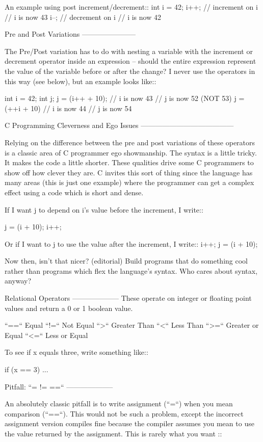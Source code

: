 An example using post increment/decrement::
    int i = 42;
    i++;     // increment on i
    // i is now 43
    i--;     // decrement on i
    // i is now 42

Pre and Post Variations
-----------------------

The Pre/Post variation has to do with nesting a variable with the increment or decrement operator inside an expression -- should the entire expression represent the value of the variable before or after the change? I never use the operators in this way (see below), but an example looks like::

    int i = 42;
    int j;
    j = (i++ + 10);
    // i is now 43
    // j is now 52 (NOT 53)
    j = (++i + 10)
    // i is now 44
    // j is now 54

C Programming Cleverness and Ego Issues
---------------------------------------

Relying on the difference between the pre and post variations of these operators is a classic area of C programmer ego showmanship. The syntax is a little tricky. It makes the code a little shorter. These qualities drive some C programmers to show off how clever they are. C invites this sort of thing since the language has many areas (this is just one example) where the programmer can get a complex effect using a code which is short and dense.

If I want j to depend on i's value before the increment, I write::

    j = (i + 10);
    i++;

Or if I want to j to use the value after the increment, I write::
    i++;
    j = (i + 10);

Now then, isn't that nicer? (editorial) Build programs that do something cool rather than programs which flex the language's syntax.   Who cares about syntax, anyway?

Relational Operators
--------------------
These operate on integer or floating point values and return a 0 or 1 boolean value. 

``==``
    Equal
``!=``
    Not Equal
``>``
    Greater Than
``<``
    Less Than
``>=``
    Greater or Equal 
``<=``
    Less or Equal

To see if x equals three, write something like::

    if (x == 3) ...


Pitfall: ``= != ==``
--------------------

An absolutely classic pitfall is to write assignment (``=``) when you mean comparison (``==``). This would not be such a problem, except the incorrect assignment version compiles fine because the compiler assumes you mean to use the value returned by the assignment. This is rarely what you want ::

